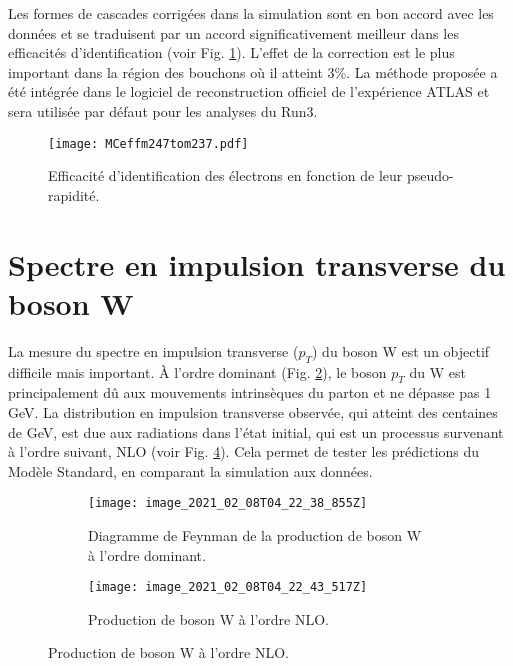 Les formes de cascades corrigées dans la simulation sont en bon accord avec les données et se traduisent par un accord significativement meilleur dans les efficacités d'identification (voir Fig. \ref{fig::SF_s}). L'effet de la correction est le plus important dans la région des bouchons où il atteint 3\%. La méthode proposée a été intégrée dans le logiciel de reconstruction officiel de l'expérience ATLAS et sera utilisée par défaut pour les analyses du Run3.
\begin{figure}[htbp]
	\centering
	\texttt{[image: MCeffm247tom237.pdf]}\\
	\caption{Efficacité d'identification des électrons en fonction de leur pseudo-rapidité.}
	\label{fig::SF_s}
\end{figure}
\clearpage
\section*{Spectre en impulsion transverse du boson W}
La mesure du spectre en impulsion transverse ($p_T$) du boson W est un objectif difficile mais important. À l'ordre dominant (Fig. \ref{fig::w_diagrams_a}), le boson $p_T$ du W est principalement dû aux mouvements intrinsèques du parton et ne dépasse pas 1 GeV. La distribution en impulsion transverse observée, qui atteint des centaines de GeV, est due aux radiations dans l'état initial, qui est un processus survenant à l'ordre suivant, NLO (voir Fig. \ref{fig::w_diagrams_b}). Cela permet de tester les prédictions du Modèle Standard, en comparant la simulation aux données.

\begin{figure}[htbp]
	\begin{subfigure}[t]{0.48\textwidth}
		\texttt{[image: image\_2021\_02\_08T04\_22\_38\_855Z]}
		\caption[W production leading order]{Diagramme de Feynman de la production de boson W à l'ordre dominant.}
		\label{fig::w_diagrams_a}
	\end{subfigure}
	\hfill
	\begin{subfigure}[t]{0.48\textwidth}
		\texttt{[image: image\_2021\_02\_08T04\_22\_43\_517Z]}
		\caption[W production NLO]{Production de boson W à l'ordre NLO.}
		\label{fig::w_diagrams_b}
	\end{subfigure}
\end{figure}


